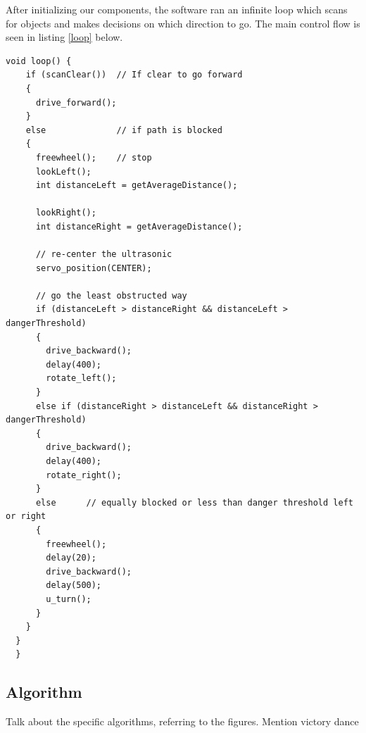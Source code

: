 \documentclass[11pt]{article}
\begin{document}
%

After initializing our components, the software ran an infinite loop which scans for objects and makes decisions on which direction to go.  The main control flow is seen in listing \ref{loop} below.

\vspace{12pt}

 \begin{lstlisting}[caption=Control Loop, label=loop]		
  void loop() {
    if (scanClear())  // If clear to go forward
    {
      drive_forward();
    }
    else              // if path is blocked
    {
      freewheel();    // stop
      lookLeft();
      int distanceLeft = getAverageDistance();

      lookRight();
      int distanceRight = getAverageDistance();
      
      // re-center the ultrasonic
      servo_position(CENTER);

      // go the least obstructed way
      if (distanceLeft > distanceRight && distanceLeft > dangerThreshold)       
      {
        drive_backward();
        delay(400);
        rotate_left();
      }
      else if (distanceRight > distanceLeft && distanceRight > dangerThreshold) 
      {
        drive_backward();
        delay(400);
        rotate_right();
      }
      else 		// equally blocked or less than danger threshold left or right
      {
        freewheel();
        delay(20);
        drive_backward();
        delay(500);
        u_turn();
      }   
    } 
  }  
  }
  \end{lstlisting}


\subsection{Algorithm}

Talk about the specific algorithms, referring to the figures.
Mention victory dance
\end{document}
